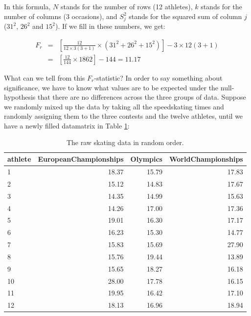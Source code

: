 \documentclass[]{report}\usepackage[]{graphicx}\usepackage[]{color}
\begin{document}
In this formula, $N$ stands for the number of rows (12 athletes), $k$ stands for the number of columns (3 occasions), and $S_j^2$ stands for the squared sum of column $j$ ($31^2$, $26^2$ and $15^2$). If we fill in these numbers, we get:

\begin{eqnarray}
F_r &=& \left[  \frac{12}{12 \times  3(3+1)} \times (31^2 + 26^2 + 15^2)      \right] - 3 \times 12 (3+1) \nonumber \\
  &=&   \left[  \frac{12}{144} \times  1862      \right] - 144 = 11.17  \nonumber
\end{eqnarray}



What can we tell from this $F_r$-statistic? In order to say something about significance, we have to know what values are to be expected under the null-hypothesis that there are no differences across the three groups of data. Suppose we randomly mixed up the data by taking all the speedskating times and randomly assigning them to the three contests and the twelve athletes, until we have a newly filled datamatrix in Table \ref{tab:nonparmixed_26}:

\begin{table}[ht]
\centering
\caption{The raw skating data in random order.} 
\label{tab:nonparmixed_26}
\begin{tabular}{lrrr}
  \hline
athlete & EuropeanChampionships & Olympics & WorldChampionships \\ 
  \hline
1 & 18.37 & 15.79 & 17.83 \\ 
  2 & 15.12 & 14.83 & 17.67 \\ 
  3 & 14.35 & 14.99 & 15.63 \\ 
  4 & 14.26 & 17.00 & 17.36 \\ 
  5 & 19.01 & 16.30 & 17.17 \\ 
  6 & 16.23 & 15.30 & 14.77 \\ 
  7 & 15.83 & 15.69 & 27.90 \\ 
  8 & 15.76 & 19.44 & 13.89 \\ 
  9 & 15.65 & 18.27 & 16.18 \\ 
  10 & 28.00 & 17.78 & 16.15 \\ 
  11 & 19.95 & 16.42 & 17.10 \\ 
  12 & 18.13 & 16.96 & 18.94 \\ 
   \hline
\end{tabular}
\end{table}
\end{document}
